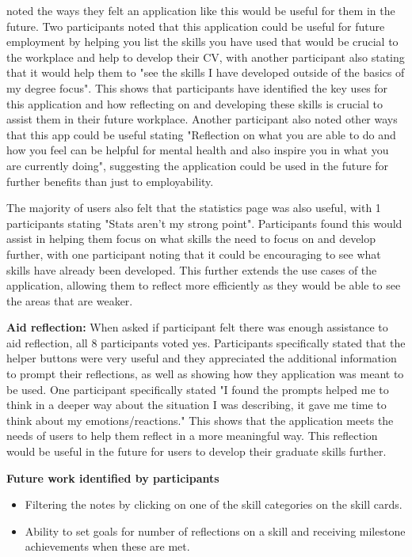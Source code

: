 \documentclass{l4proj}
\begin{document}
noted the ways they felt an application like this would be useful for them in the future. Two participants noted that this application
could be useful for future employment by helping you list the skills you have used that would be crucial to the workplace and help to 
develop their CV, with another participant also stating that it would help them to "see the skills I have developed outside of the 
basics of my degree focus". This shows that participants have identified the key uses for this application and how reflecting on and 
developing these skills is crucial to assist them in their future workplace. Another participant also noted other ways that this app could 
be useful stating "Reflection on what you are able to do and how you feel can be helpful for mental health and also inspire you in 
what you are currently doing", suggesting the application could be used in the future for further benefits than just to employability.
\par 
The majority of users also felt that the statistics page was also useful, with 1 participants stating "Stats aren't my strong point". 
Participants found this would assist in helping them focus on what skills the need to focus on and develop further, with one 
participant noting that it could be encouraging to see what skills have already been developed. This further extends the use cases of the 
application, allowing them to reflect more efficiently as they would be able to see the areas that are weaker. 
\par 
\textbf{Aid reflection:} When asked if participant felt there was enough assistance to aid reflection, all 8 participants voted 
yes. Participants specifically stated that the helper buttons were very useful and they appreciated the additional information to
prompt their reflections, as well as showing how they application was meant to be used. One participant specifically stated 
"I found the prompts helped me to think in a deeper way about the situation I was describing, it gave me time to think about 
my emotions/reactions." This shows that the application meets the needs of users to help them reflect in a more meaningful way.
This reflection would be useful in the future for users to develop their graduate skills further.
\par 

\textbf{Future work identified by participants}
\begin{itemize}
    \item Filtering the notes by clicking on one of the skill categories on the skill cards.
    \item Ability to set goals for number of reflections on a skill and receiving milestone achievements when these are met.
\end{itemize}
\end{document}
